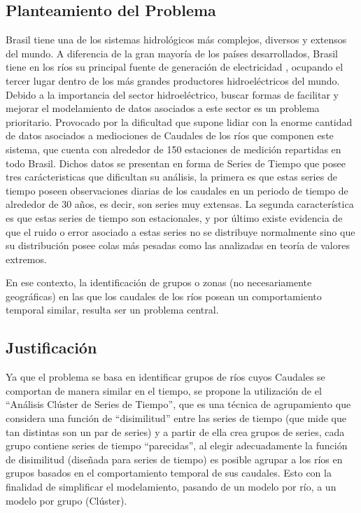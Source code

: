 \documentclass[10pt,a4paper]{article}
\begin{document}
\subsection{Planteamiento del Problema}
Brasil tiene una de los sistemas hidrológicos más complejos, diversos y extensos del mundo. A diferencia de la gran mayoría de los países desarrollados, Brasil tiene en los ríos su principal fuente de generación de electricidad , ocupando el tercer lugar dentro de los más grandes productores hidroeléctricos del mundo. Debido a la importancia del sector hidroeléctrico, buscar formas de facilitar y mejorar el modelamiento de datos asociados a este sector es un problema prioritario. Provocado por la dificultad que supone lidiar con la enorme cantidad de datos asociados a mediociones de Caudales de los ríos que componen este sistema, que cuenta con alrededor de 150 estaciones de medición repartidas en todo Brasil. Dichos datos se presentan en forma de Series de Tiempo que posee tres carácteristicas que dificultan su análisis, la primera es que estas series de tiempo poseen observaciones diarias de los caudales en un periodo de tiempo de alrededor de 30 años, es decir, son series muy extensas. La segunda característica es que estas series de tiempo son estacionales, y por último existe evidencia de que el ruido o error asociado a estas series no se distribuye normalmente sino que su distribución posee colas más pesadas como las analizadas en teoría de valores extremos.

En ese contexto, la identificación de grupos o zonas (no necesariamente geográficas) en las que los caudales de los ríos posean un comportamiento temporal similar, resulta ser un problema central.



\subsection{Justificación}
Ya que el problema se basa en identificar grupos de ríos cuyos Caudales se comportan de manera similar en el tiempo, se propone la utilización de el “Análisis Clúster de Series de Tiempo”, que es una técnica de agrupamiento que considera una función de “disimilitud” entre las series de tiempo (que mide que tan distintas son un par de series) y a partir de ella crea grupos de series, cada grupo contiene series de tiempo “parecidas”, al elegir adecuadamente la función de disimilitud (diseñada para series de tiempo) es posible agrupar a los ríos en grupos basados en el comportamiento temporal de sus caudales. Esto con la finalidad de simplificar el modelamiento, pasando de un modelo por río, a un modelo por grupo (Clúster).
\end{document}
